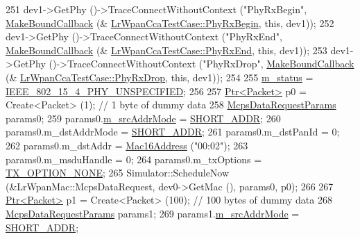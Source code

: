 \begin{DoxyCode}
251   dev1->GetPhy ()->TraceConnectWithoutContext (\textcolor{stringliteral}{"PhyRxBegin"}, \hyperlink{group__makeboundcallback_ga1725d6362e6065faa0709f7c93f8d770}{MakeBoundCallback} (&
      \hyperlink{classLrWpanCcaTestCase_a7d236bfc6109f581582255227b8dee77}{LrWpanCcaTestCase::PhyRxBegin}, \textcolor{keyword}{this}, dev1));
252   dev1->GetPhy ()->TraceConnectWithoutContext (\textcolor{stringliteral}{"PhyRxEnd"}, \hyperlink{group__makeboundcallback_ga1725d6362e6065faa0709f7c93f8d770}{MakeBoundCallback} (&
      \hyperlink{classLrWpanCcaTestCase_aed133fe6504b326574ada94b6043abcf}{LrWpanCcaTestCase::PhyRxEnd}, \textcolor{keyword}{this}, dev1));
253   dev1->GetPhy ()->TraceConnectWithoutContext (\textcolor{stringliteral}{"PhyRxDrop"}, \hyperlink{group__makeboundcallback_ga1725d6362e6065faa0709f7c93f8d770}{MakeBoundCallback} (&
      \hyperlink{classLrWpanCcaTestCase_a302ae211f206663a114fcd5a07752d5c}{LrWpanCcaTestCase::PhyRxDrop}, \textcolor{keyword}{this}, dev1));
254 
255   \hyperlink{classLrWpanCcaTestCase_adbf2d30b281bb65318deaef492ceecd3}{m\_status} = \hyperlink{group__lr-wpan_gga6494269d13d45c511a07b7ccbb1de754a33aedad985a3e4dd7a0c6790a2c677a0}{IEEE\_802\_15\_4\_PHY\_UNSPECIFIED};
256 
257   \hyperlink{classns3_1_1Ptr}{Ptr<Packet>} p0 = Create<Packet> (1);  \textcolor{comment}{// 1 byte of dummy data}
258   \hyperlink{structns3_1_1McpsDataRequestParams}{McpsDataRequestParams} params0;
259   params0.\hyperlink{structns3_1_1McpsDataRequestParams_a31f4c281d07cf3b5992d45416bd71309}{m\_srcAddrMode} = \hyperlink{group__lr-wpan_gga9ea4702ab11d5329e1593afebce06bbba7bf58267dde39bdabfeeb5793450c5e3}{SHORT\_ADDR};
260   params0.m\_dstAddrMode = \hyperlink{group__lr-wpan_gga9ea4702ab11d5329e1593afebce06bbba7bf58267dde39bdabfeeb5793450c5e3}{SHORT\_ADDR};
261   params0.m\_dstPanId = 0;
262   params0.m\_dstAddr = \hyperlink{classns3_1_1Mac16Address}{Mac16Address} (\textcolor{stringliteral}{"00:02"});
263   params0.m\_msduHandle = 0;
264   params0.m\_txOptions = \hyperlink{group__lr-wpan_gga74ea891230ebf45d80d69a67266930a4a873c8b896435efcdd1c058668efb88ea}{TX\_OPTION\_NONE};
265   Simulator::ScheduleNow (&LrWpanMac::McpsDataRequest, dev0->GetMac (), params0, p0);
266 
267   \hyperlink{classns3_1_1Ptr}{Ptr<Packet>} p1 = Create<Packet> (100);  \textcolor{comment}{// 100 bytes of dummy data}
268   \hyperlink{structns3_1_1McpsDataRequestParams}{McpsDataRequestParams} params1;
269   params1.\hyperlink{structns3_1_1McpsDataRequestParams_a31f4c281d07cf3b5992d45416bd71309}{m\_srcAddrMode} = \hyperlink{group__lr-wpan_gga9ea4702ab11d5329e1593afebce06bbba7bf58267dde39bdabfeeb5793450c5e3}{SHORT\_ADDR};

\end{DoxyCode}
